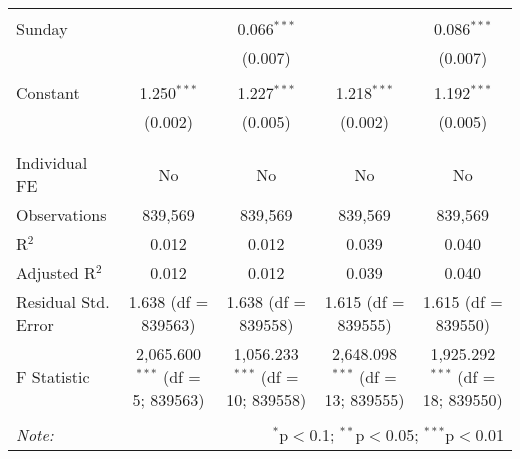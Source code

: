 \documentclass[
]{article}
\begin{document}
\begin{table}[!htbp]
{\begin{tabular}{@{\extracolsep{5pt}}lcccc}
  & & & & \\ 
 Sunday &  & 0.066$^{***}$ &  & 0.086$^{***}$ \\ 
  &  & (0.007) &  & (0.007) \\ 
  & & & & \\ 
 Constant & 1.250$^{***}$ & 1.227$^{***}$ & 1.218$^{***}$ & 1.192$^{***}$ \\ 
  & (0.002) & (0.005) & (0.002) & (0.005) \\ 
  & & & & \\ 
\hline \\[-1.8ex] 
Individual FE & No & No & No & No \\ 
Observations & 839,569 & 839,569 & 839,569 & 839,569 \\ 
R$^{2}$ & 0.012 & 0.012 & 0.039 & 0.040 \\ 
Adjusted R$^{2}$ & 0.012 & 0.012 & 0.039 & 0.040 \\ 
Residual Std. Error & 1.638 (df = 839563) & 1.638 (df = 839558) & 1.615 (df = 839555) & 1.615 (df = 839550) \\ 
F Statistic & 2,065.600$^{***}$ (df = 5; 839563) & 1,056.233$^{***}$ (df = 10; 839558) & 2,648.098$^{***}$ (df = 13; 839555) & 1,925.292$^{***}$ (df = 18; 839550) \\ 
\hline 
\hline \\[-1.8ex] 
\textit{Note:}  & \multicolumn{4}{r}{$^{*}$p$<$0.1; $^{**}$p$<$0.05; $^{***}$p$<$0.01} \\ 
\end{tabular}
} 
\end{table} 
\newpage
\end{document}
